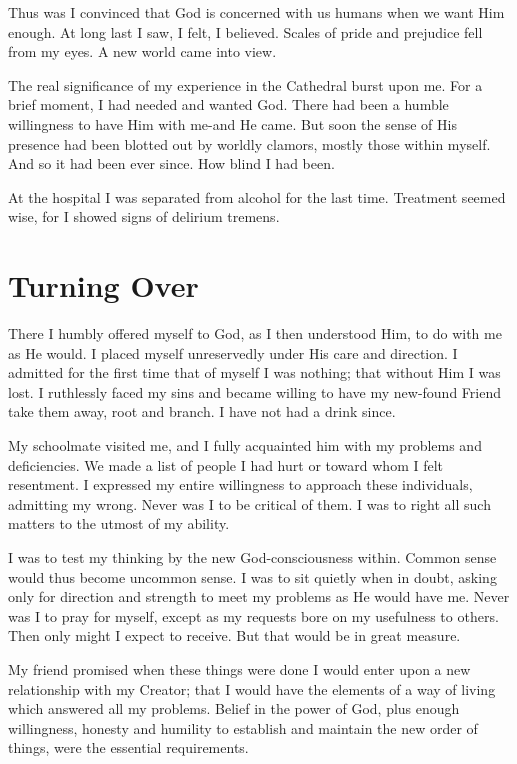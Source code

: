 Thus was I convinced that God is concerned with us humans when we want Him enough.
At long last I saw, I felt, I believed.
Scales of pride and prejudice fell from my eyes.
A new world came into view.

The real significance of my experience in the Cathedral burst upon me.
For a brief moment, I had needed and wanted God.
There had been a humble willingness to have Him with me-and He came.
But soon the sense of His presence had been blotted out by worldly clamors, mostly those within myself.
And so it had been ever since.
How blind I had been.

At the hospital I was separated from alcohol for the last time.
Treatment seemed wise, for I showed signs of delirium tremens.


\section{Turning Over}

There I humbly offered myself to God, as I then understood Him, to do with me as He would.
I placed myself unreservedly under His care and direction.
I admitted for the first time that of myself I was nothing; that without Him I was lost.
I ruthlessly faced my sins and became willing to have my new-found Friend take them away, root and branch.
I have not had a drink since.

My schoolmate visited me, and I fully acquainted him with my problems and deficiencies.
We made a list of people I had hurt or toward whom I felt resentment.
I expressed my entire willingness to approach these individuals, admitting my wrong.
Never was I to be critical of them.
I was to right all such matters to the utmost of my ability.

I was to test my thinking by the new God-consciousness within.
Common sense would thus become uncommon sense.
I was to sit quietly when in doubt, asking only for direction and strength to meet my problems as He would have me.
Never was I to pray for myself, except as my requests bore on my usefulness to others.
Then only might I expect to receive.
But that would be in great measure.

My friend promised when these things were done I would enter upon a new relationship with my Creator; that I would have the elements of a way of living which answered all my problems.
Belief in the power of God, plus enough willingness, honesty and humility to establish and maintain the new order of things, were the essential requirements.

